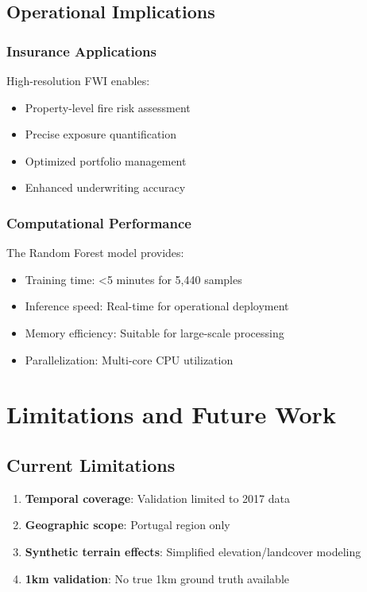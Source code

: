 \documentclass[11pt,a4paper]{article}
\begin{document}
\subsection{Operational Implications}

\subsubsection{Insurance Applications}
High-resolution FWI enables:
\begin{itemize}
    \item Property-level fire risk assessment
    \item Precise exposure quantification
    \item Optimized portfolio management
    \item Enhanced underwriting accuracy
\end{itemize}

\subsubsection{Computational Performance}
The Random Forest model provides:
\begin{itemize}
    \item Training time: <5 minutes for 5,440 samples
    \item Inference speed: Real-time for operational deployment
    \item Memory efficiency: Suitable for large-scale processing
    \item Parallelization: Multi-core CPU utilization
\end{itemize}

\section{Limitations and Future Work}

\subsection{Current Limitations}
\begin{enumerate}
    \item \textbf{Temporal coverage}: Validation limited to 2017 data
    \item \textbf{Geographic scope}: Portugal region only
    \item \textbf{Synthetic terrain effects}: Simplified elevation/landcover modeling
    \item \textbf{1km validation}: No true 1km ground truth available
\end{enumerate}
\end{document}
